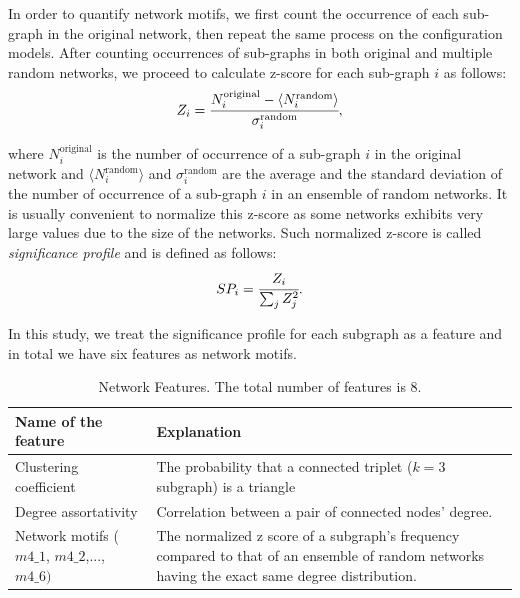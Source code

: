\documentclass{article}
\begin{document}
In order to quantify network motifs, we first count the occurrence of each sub-graph in the original network, then repeat the same process on the configuration models. After counting occurrences of sub-graphs in both original and multiple random networks, we proceed to calculate z-score for each sub-graph $i$ as follows:
	\begin{equation}
	Z_i = \cfrac{N_i^{\text{original}} - \langle N_i^{\text{random}} \rangle }{\sigma_i^{\text{random}}},
	\end{equation}

where $N_i^{\text{original}}$ is the number of occurrence of a sub-graph $i$ in the original network and $ \langle N_i^{\text{random}} \rangle$ and $\sigma_i^{\text{random}}$ are the average and the standard deviation of the number of occurrence of a sub-graph $i$ in an ensemble of random networks. It is usually convenient to normalize this z-score as some networks exhibits very large values due to the size of the networks. Such normalized z-score is called \textit{significance profile} and is defined as follows:
	\begin{equation}
	SP_i = \cfrac{Z_i}{\sum_j Z_j^2}.
	\end{equation}
	
In this study, we treat the significance profile for each subgraph as a feature and in total we have six features as network motifs.
\newline



\begin{table}[htb]
  \begin{center}
    \caption{Network Features. The total number of features is $8$.}
    \begin{tabular}{| l | p{8cm} |} \hline
      Name of the feature & Explanation  \\ \hline \hline
      Clustering coefficient &  The probability that a connected triplet ($k=3$ subgraph) is a triangle \\  %
      Degree assortativity &  Correlation between a pair of connected nodes' degree. \\  %
      Network motifs ($m4\_1$, $m4\_2$,..., $m4\_6)$& The normalized z score of a subgraph's frequency compared to that of an ensemble of random networks having the exact same degree distribution. \\ \hline
    \end{tabular}
    \label{tab:feature}
  \end{center}
\end{table}
\end{document}
